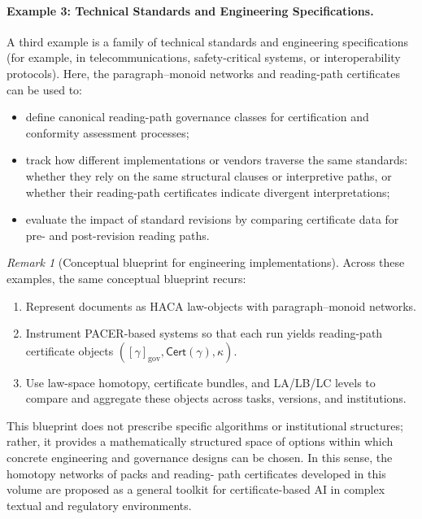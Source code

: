 \documentclass[11pt]{book}
\theoremstyle{plain}
\theoremstyle{definition}
\theoremstyle{remark}
\newtheorem{remark}[theorem]{Remark}
\begin{document}
\paragraph{Example 3: Technical Standards and Engineering Specifications.}

A third example is a family of technical standards and engineering
specifications (for example, in telecommunications, safety-critical
systems, or interoperability protocols). Here, the paragraph–monoid
networks and reading-path certificates can be used to:
\begin{itemize}
  \item define canonical reading-path governance classes for
        certification and conformity assessment processes;
  \item track how different implementations or vendors traverse the
        same standards: whether they rely on the same structural
        clauses or interpretive paths, or whether their reading-path
        certificates indicate divergent interpretations;
  \item evaluate the impact of standard revisions by comparing
        certificate data for pre- and post-revision reading paths.
\end{itemize}

\begin{remark}[Conceptual blueprint for engineering implementations]
\label{rem:conceptual-blueprint}
Across these examples, the same conceptual blueprint recurs:
\begin{enumerate}
  \item Represent documents as HACA law-objects with paragraph–monoid
        networks.
  \item Instrument PACER-based systems so that each run yields
        reading-path certificate objects
        $([\gamma]_{\mathrm{gov}},\mathsf{Cert}(\gamma),\kappa)$.
  \item Use law-space homotopy, certificate bundles, and LA/LB/LC
        levels to compare and aggregate these objects across tasks,
        versions, and institutions.
\end{enumerate}
This blueprint does not prescribe specific algorithms or institutional
structures; rather, it provides a mathematically structured space of
options within which concrete engineering and governance designs can
be chosen. In this sense, the homotopy networks of packs and reading-
path certificates developed in this volume are proposed as a general
toolkit for certificate-based AI in complex textual and regulatory
environments.
\end{remark}
\end{document}
